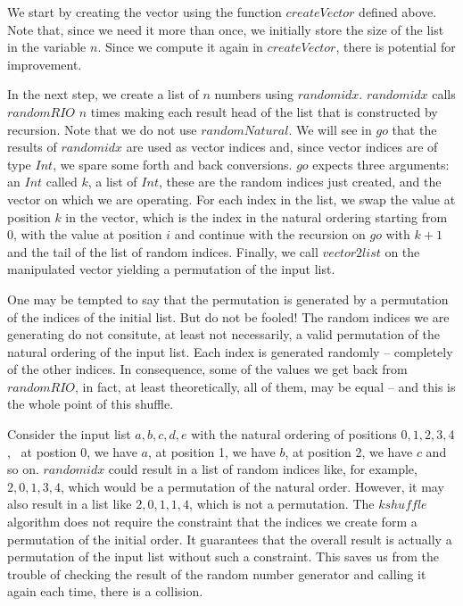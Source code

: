 \documentclass{scrreprt}
\newcommand{\Conid}[1]{\mathit{#1}}
\newcommand{\Varid}[1]{\mathit{#1}}
\begin{document}
We start by creating the vector
using the function \ensuremath{\Varid{createVector}} defined above.
Note that, since we need it
more than once, we initially store
the size of the list in the variable \ensuremath{\Varid{n}}.
Since we compute it again in \ensuremath{\Varid{createVector}},
there is potential for improvement.

In the next step, we create a list of \ensuremath{\Varid{n}} numbers
using \ensuremath{\Varid{randomidx}}. \ensuremath{\Varid{randomidx}} calls \ensuremath{\Varid{randomRIO}}
\ensuremath{\Varid{n}} times making each result head of the list
that is constructed by recursion.
Note that we do not use \ensuremath{\Varid{randomNatural}}.
We will see in \ensuremath{\Varid{go}} that the results of \ensuremath{\Varid{randomidx}}
are used as vector indices and, since vector indices
are of type \ensuremath{\Conid{Int}}, we spare some forth and back conversions.
\ensuremath{\Varid{go}} expects three arguments: an \ensuremath{\Conid{Int}} called $k$, a list of \ensuremath{\Conid{Int}},
these are the random indices just created, and the vector
on which we are operating.
For each index in the list, we swap 
the value at position \ensuremath{\Varid{k}} in the vector,
which is the index in the natural ordering starting from 0,
with the value at position \ensuremath{\Varid{i}} and continue with the recursion
on \ensuremath{\Varid{go}} with \ensuremath{\Varid{k}\mathbin{+}\mathrm{1}} and the tail
of the list of random indices.
Finally, we call \ensuremath{\Varid{vector2list}} on the manipulated vector
yielding a permutation of the input list.

One may be tempted to say that the permutation
is generated by a permutation of the indices
of the initial list. But do not be fooled!
The random indices we are generating do not consitute,
at least not necessarily, a valid permutation
of the natural ordering of the input list.
Each index is generated randomly -- completely
 of the other indices.
In consequence, some of the values we get
back from \ensuremath{\Varid{randomRIO}}, in fact, at least theoretically,
all of them, may be equal --
and this is the whole point of this shuffle.

Consider the input list $a,b,c,d,e$
with the natural ordering of positions
$0,1,2,3,4$, \ie\ at postion 0, we have $a$,
at position 1, we have $b$,
at position 2, we have $c$ and so on.
\ensuremath{\Varid{randomidx}} could result in a list of
random indices like, for example, $2,0,1,3,4$,
which would be a permutation of the natural order.
However, it may also result in a list like
$2,0,1,1,4$, which is not a permutation.
The \ensuremath{\Varid{kshuffle}} algorithm does not require
the constraint that the indices we create
form a permutation of the initial order.
It guarantees that the overall result is
actually a permutation of the input list
without such a constraint.
This saves us from the trouble of checking
the result of the random number generator
and calling it again each time,
there is a collision.
\end{document}

